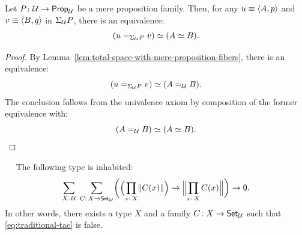 \begin{thm}\ua\label{thm:generalized-total-space}
    Let\/ $P\colon\univ\to\fun{Prop}_\univ$ be a mere proposition family. Then, for any\/ $u\equiv\langle A,p\rangle$ and\/ $v\equiv\langle B,q\rangle$ in\/ $\Sigma_\mathcal U P$, there is an equivalence:
    \[
        (u\mathrel{=_{\Sigma_\mathcal U P}}v)\simeq(A\simeq B).
    \]
\end{thm}

\begin{proof}
    By Lemma~\ref{lem:total-space-with-mere-proposition-fibers}, there is an equivalence:
    \[
        (u\mathrel{=_{\Sigma_\mathcal U P}}v)\simeq(A\mathrel{=_{\mathcal U}}B).
    \]
    The conclusion follows from the univalence axiom by composition of the former equivalence with:
    \[
        (A\mathrel{=_{\mathcal U}}B)\simeq(A\simeq B).
    \]
\end{proof}


\begin{cor}\ua\ \fe\ \we\label{cor:general-tac-is-false}
    The following type is inhabited:
    \[
        \sum_{X\colon\univ}\;\sum_{C\colon X\to\fun{Set}_\univ}
        \biggl(
            \Bigl(\prod_{x\colon X}\lVert C(x)\rVert\Bigr)
            \to
            \Bigl\lVert\prod_{x\colon X}C(x)\Bigr\rVert
        \biggr)\to\fun0.
    \]
    In other words, there exists a type\/ $X$ and a family\/ $C\colon X\to\fun{Set}_\univ$ such that\/ {\upshape\eqref{eq:traditional-tac}} is false.
\end{cor}

